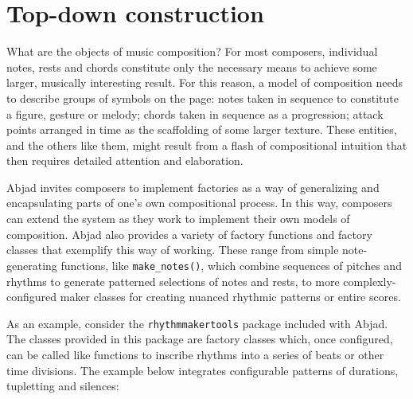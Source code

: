 \documentclass{article}
\begin{document}

\section{Top-down construction} \label{sec:top-down}

What are the objects of music composition? For most composers, individual
notes, rests and chords constitute  only the necessary means to achieve some
larger, musically interesting result. For this reason, a model of composition
needs to describe groups of symbols on the page: notes taken in sequence to
constitute a figure, gesture or melody; chords taken in sequence as a
progression; attack points arranged in time as the scaffolding of some larger
texture. These entities, and the others like them, might result from a flash of
compositional intuition that then requires detailed attention and elaboration.

Abjad invites composers to implement factories as a way of generalizing and encapsulating parts of one's own compositional process. In this way, composers can extend the system as they work to implement their own models of composition. Abjad also provides a variety of factory functions and factory classes that exemplify this way of working. These range from simple note-generating functions, like \texttt{make\_notes()}, which
combine sequences of pitches and rhythms to generate patterned selections
of notes and rests, to more complexly-configured maker classes for
creating nuanced rhythmic patterns or entire scores.

As an example, consider the \texttt{rhythmmakertools} package included with Abjad.
The classes provided in this package are factory classes which, once
configured, can be called like functions to inscribe rhythms into
a series of beats or other time divisions. The example below integrates configurable patterns of durations, tupletting and silences:

\end{document}
